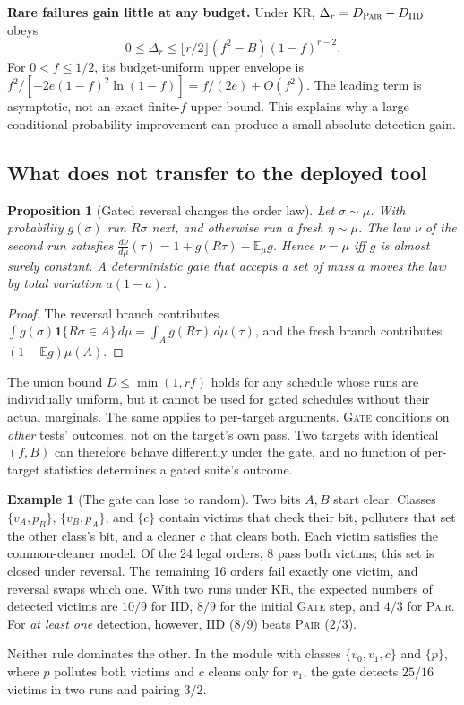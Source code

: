 \documentclass[conference,letterpaper]{IEEEtran}
\newtheorem{proposition}{Proposition}
\theoremstyle{definition}
\newtheorem{example}{Example}
\newcommand{\E}{\mathbb{E}}
\newcommand{\IIDp}{\textup{\textsc{IID}}}
\newcommand{\PAIRp}{\textup{\textsc{Pair}}}
\newcommand{\GATEp}{\textup{\textsc{Gate}}}
\begin{document}
\textbf{Rare failures gain little at any budget.}\label{cor:gain}
Under KR, $\Delta_r=D_{\PAIRp}-D_{\IIDp}$ obeys
\[
0\le\Delta_r\le\lfloor r/2\rfloor(f^2-B)(1-f)^{r-2}.
\]
For $0<f\le1/2$, its budget-uniform upper envelope is
$f^2/[-2e(1-f)^2\ln(1-f)]=f/(2e)+O(f^2)$.
The leading term is asymptotic, not an exact finite-$f$ upper bound. This explains why a large conditional probability improvement can produce a small absolute detection gain.

\subsection{What does not transfer to the deployed tool}
\begin{proposition}[Gated reversal changes the order law]\label{prop:gate}
Let $\sigma\sim\mu$. With probability $g(\sigma)$ run $R\sigma$ next, and otherwise run a fresh $\eta\sim\mu$. The law $\nu$ of the second run satisfies $\frac{d\nu}{d\mu}(\tau)=1+g(R\tau)-\E_\mu g$. Hence $\nu=\mu$ iff $g$ is almost surely constant. A deterministic gate that accepts a set of mass $a$ moves the law by total variation $a(1-a)$.
\end{proposition}
\begin{proof}
The reversal branch contributes $\int g(\sigma)\mathbf 1\{R\sigma\in A\}\,d\mu=\int_A g(R\tau)\,d\mu(\tau)$, and the fresh branch contributes $(1-\E g)\mu(A)$.
\end{proof}
The union bound $D\le\min(1,rf)$ holds for any schedule whose runs are individually uniform, but it cannot be used for gated schedules without their actual marginals. The same applies to per-target arguments. \GATEp{} conditions on \emph{other} tests' outcomes, not on the target's own pass. Two targets with identical $(f,B)$ can therefore behave differently under the gate, and no function of per-target statistics determines a gated suite's outcome.

\begin{example}[The gate can lose to random]\label{ex:suite}
Two bits $A,B$ start clear. Classes $\{v_A,p_B\}$, $\{v_B,p_A\}$, and $\{c\}$ contain victims that check their bit, polluters that set the other class's bit, and a cleaner $c$ that clears both. Each victim satisfies the common-cleaner model. Of the 24 legal orders, 8 pass both victims; this set is closed under reversal. The remaining 16 orders fail exactly one victim, and reversal swaps which one. With two runs under KR, the expected numbers of detected victims are $10/9$ for \IIDp{}, $8/9$ for the initial \GATEp{} step, and $4/3$ for \PAIRp{}. For \emph{at least one} detection, however, \IIDp{} ($8/9$) beats \PAIRp{} ($2/3$).
\end{example}
Neither rule dominates the other. In the module with classes $\{v_0,v_1,c\}$ and $\{p\}$, where $p$ pollutes both victims and $c$ cleans only for $v_1$, the gate detects $25/16$ victims in two runs and pairing $3/2$.
\end{document}

